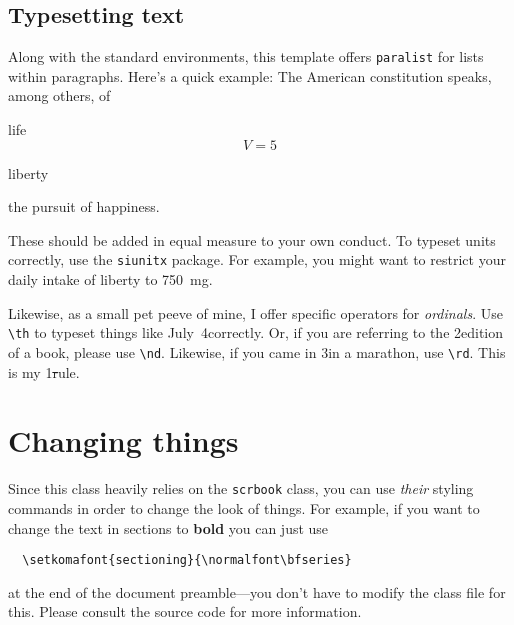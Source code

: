 \subsection{Typesetting text}

Along with the standard environments, this template offers
\verb|paralist| for lists within paragraphs.
%
Here's a quick example: The American constitution speaks, among others, of
%
\begin{inparaenum}[(a)]
  \item life
  \begin{equation}
    V = 5
  \end{equation}
  \item liberty
  \item the pursuit of happiness.
\end{inparaenum}
%
These should be added in equal measure to your own conduct. To typeset
units correctly, use the \verb|siunitx| package. For example, you might
want to restrict your daily intake of liberty to \SI{750}{\milli\gram}.

Likewise, as a small pet peeve of mine, I offer specific operators for \emph{ordinals}. Use \verb|\th| to typeset things like July~4\th correctly. Or, if you are referring to the 2\nd edition of a book, please use \verb|\nd|. Likewise, if you came in 3\rd in a marathon, use \verb|\rd|. This is my 1\st rule.

\section{Changing things}

Since this class heavily relies on the \verb|scrbook| class, you can use
\emph{their} styling commands in order to change the look of things. For
example, if you want to change the text in sections to \textbf{bold} you
can just use
%
\begin{verbatim}
  \setkomafont{sectioning}{\normalfont\bfseries}
\end{verbatim}
%
at the end of the document preamble---you don't have to modify the class
file for this. Please consult the source code for more information.
